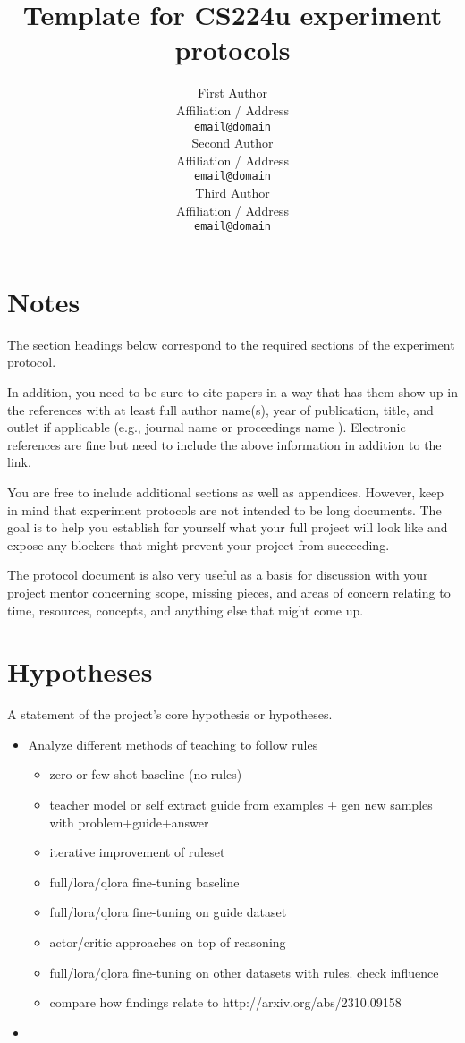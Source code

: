 \documentclass[11pt]{article}
\title{Template for CS224u experiment protocols}
\author{First Author \\
Affiliation / Address \\
\texttt{email@domain} \\\And
Second Author \\
Affiliation / Address  \\
\texttt{email@domain} \\\And
Third Author \\
Affiliation / Address \\
\texttt{email@domain}
}
\begin{document}
    \maketitle

    \section*{Notes}

    The section headings below correspond to the required sections of the experiment protocol.

    In addition, you need to be sure to cite papers in a way that has them show up in the references with at least
    full author name(s), year of publication, title, and outlet if applicable (e.g., journal name or proceedings name
    ).
    Electronic references are fine but need to include the above information in addition to the link.

    You are free to include additional sections as well as appendices.
    However, keep in mind that experiment protocols are not intended to be long documents.
    The goal is to help you establish for yourself what your full project will look like and expose any blockers that might prevent your project from succeeding.

    The protocol document is also very useful as a basis for discussion with your project mentor concerning scope,
    missing pieces, and areas of concern relating to time, resources, concepts, and anything else that might come up.


    \section{Hypotheses}

    A statement of the project's core hypothesis or hypotheses.

    \begin{itemize}
        \item Analyze different methods of teaching to follow rules
        \begin{itemize}
            \item zero or few shot baseline (no rules)
            \item teacher model or self extract guide from examples + gen new samples with problem+guide+answer
            \item iterative improvement of ruleset
            \item full/lora/qlora fine-tuning baseline
            \item full/lora/qlora fine-tuning on guide dataset
            \item actor/critic approaches on top of reasoning
            \item full/lora/qlora fine-tuning on other datasets with rules. check influence
            \item compare how findings relate to http://arxiv.org/abs/2310.09158
        \end{itemize}
        \item
    \end{itemize}
\end{document}
